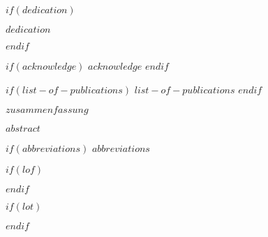 \documentclass[a4paper,11pt]{article}
\begin{document}
$if(dedication)$
\null
\vspace{5cm}
\begin{center}
\textit{$dedication$}
\end{center}
\newpage\null\thispagestyle{empty}\newpage
$endif$


$if(acknowledge)$
\newpage
$acknowledge$
$endif$
\pagestyle{plain}
\setcounter{page}{1}    %
\newpage\null\thispagestyle{empty}\newpage


$if(list-of-publications)$
$list-of-publications$
\newpage\null\thispagestyle{empty}\newpage
$endif$


$zusammenfassung$
\newpage\null\thispagestyle{empty}\newpage


$abstract$
\newpage\null\thispagestyle{empty}\newpage

\newpage
\tableofcontents
\clearpage

$if(abbreviations)$
\newpage
$abbreviations$

$if(lof)$
\listoffigures
{}
$endif$

$if(lot)$
\newpage
\listoftables
{}
$endif$
\end{document}
